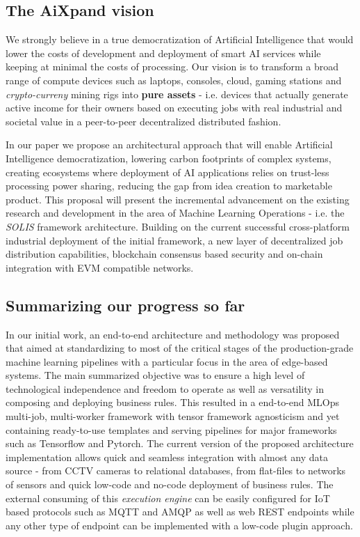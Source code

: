 \documentclass{article}
\begin{document}
\subsection{The AiXpand vision}
We strongly believe in a true democratization of Artificial Intelligence that would lower the costs of development and deployment of smart AI services while keeping at minimal the costs of processing. Our vision is to transform a broad range of compute devices such as laptops, consoles, cloud, gaming stations and \emph{crypto-curreny} mining rigs into \textbf{pure assets} - i.e. devices that actually generate active income for their owners based on executing jobs with real industrial and societal value in a peer-to-peer decentralized distributed fashion. 

In our paper we propose an architectural approach that will enable Artificial Intelligence democratization, lowering carbon footprints of complex systems, creating ecosystems where deployment of AI applications relies on trust-less processing power sharing, reducing the gap from idea creation to marketable product. This proposal will present the incremental advancement on the existing research and development in the area of Machine Learning Operations - i.e. the \emph{SOLIS}\cite{ciobanu2021solis} framework architecture. Building on the current successful cross-platform industrial deployment of the initial framework, a new layer of decentralized job distribution capabilities, blockchain consensus based security and on-chain integration with EVM\cite{wood2014ethereum} compatible networks.

\subsection{Summarizing our progress so far}
In our initial work\cite{ciobanu2021solis}, an end-to-end architecture and methodology was proposed that aimed at standardizing to most of the critical stages of the production-grade machine learning pipelines with a particular focus in the area of edge-based systems. The main summarized objective was to ensure a high level of technological independence and freedom to operate as well as versatility in composing and deploying business rules. This resulted in a end-to-end MLOps multi-job, multi-worker framework with tensor framework agnosticism and yet containing ready-to-use templates and serving pipelines for major frameworks such as Tensorflow\cite{abadi2016tensorflow} and Pytorch\cite{paszke2019pytorch}. The current version of the proposed architecture implementation allows quick and seamless integration with almost any data source - from CCTV cameras to relational databases, from flat-files to networks of sensors and  quick low-code and no-code deployment of business rules. The external consuming of this \emph{execution engine} can be easily configured for IoT based protocols such as MQTT\cite{hunkeler2008mqtt}\cite{mqtt} and AMQP\cite{amqp} as well as web REST endpoints while any other type of endpoint can be implemented with a low-code plugin approach.
\end{document}

